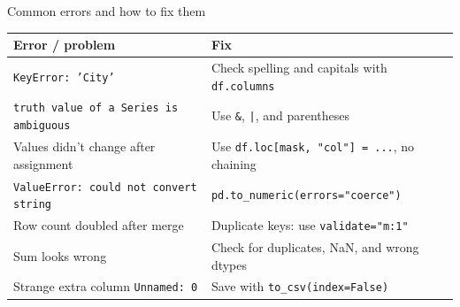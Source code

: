 \documentclass[aspectratio=169,10pt]{beamer}
\newcommand{\code}[1]{\texttt{#1}}
\begin{document}
\begin{frame}{Common errors and how to fix them}
  \small
  \renewcommand{\arraystretch}{1.25}
  \begin{tabular}{p{4.4cm}p{6.6cm}}
    \toprule
    \textbf{Error / problem} & \textbf{Fix}\\
    \midrule
    \code{KeyError: 'City'} & Check spelling and capitals with \code{df.columns}\\
    \code{truth value of a Series is ambiguous} & Use \code{\&}, \code{|}, and parentheses\\
    Values didn't change after assignment & Use \code{df.loc[mask, "col"] = ...}, no chaining\\
    \code{ValueError: could not convert string} & \code{pd.to\_numeric(errors="coerce")}\\
    Row count doubled after merge & Duplicate keys: use \code{validate="m:1"}\\
    Sum looks wrong & Check for duplicates, NaN, and wrong dtypes\\
    Strange extra column \code{Unnamed: 0} & Save with \code{to\_csv(index=False)}\\
    \bottomrule
  \end{tabular}
\end{frame}
\end{document}
